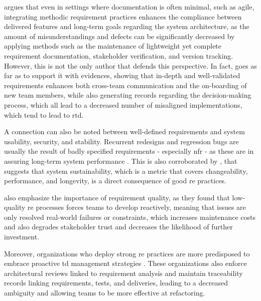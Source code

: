 \documentclass[12pt,reqno, twoside]{amsbook}
\theoremstyle{plain}
\numberwithin{equation}{chapter}
\numberwithin{section}{chapter}
\begin{document}
\textcite{Behutiye2022} argues that even in settings where documentation is often minimal, such as agile, integrating methodic requirement practices enhances the compliance between delivered features and long-term  goals regarding the system architecture, as the amount of misunderstandings and defects can be significantly decreased by applying methods such as the maintenance of lightweight yet complete requirement documentation, stakeholder verification, and version tracking. However, this is not the only author that defends this perspective. In fact, \textcite{Melo2022} goes as far as to support it with evidences, showing that in-depth and well-validated requirements enhances both cross-team communication and the on-boarding of new team members, while also generating records regarding the decision-making process, which all lead to a decreased number of misaligned implementations, which tend to lead to \gls{rtd}.

A connection can also be noted between well-defined requirements and system usability, security, and stability. Recurrent redesigns and regression bugs are usually the result of badly specified requirements - especially \gls{nfr} - as these are in assuring long-term system performance \parencite{Femmer2019}. This is also corroborated by \textcite{Venters2023}, that suggests that system sustainability, which is a metric that covers changeability, performance, and longevity, is a direct consequence of good \gls{re} practices.

\textcite{Vogelsang2020} also emphasize the importance of requirement quality, as they found that low-quality \gls{re} processes forces teams to develop reactively, meaning that issues are only resolved real-world failures or constraints, which increases maintenance costs and also degrades stakeholder trust and decreases the likelihood of further investment.

Moreover, organizations who deploy strong \gls{re} practices are more predisposed to embrace proactive \gls{td} management strategies  \parencite{Waltersdorfer2020}. These organizations also enforce architectural reviews linked to requirement analysis and maintain traceability records linking requirements, tests, and deliveries, leading to a decreased ambiguity and allowing teams to be more effective at  refactoring.
\end{document}
